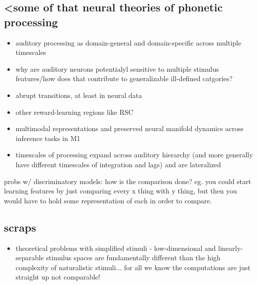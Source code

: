 \begin{multicols}{2}
\subsection{<some of that neural theories of phonetic processing}

\begin{itemize}
\item auditory processing as domain-general and domain-specific across multiple timescales \cite{norman-haignereHierarchicalIntegrationMultiple2020}
\item why are auditory neurons potentialyl sensitive to multiple stimulus features/how does that contribute to generalizable ill-defined catgories? \cite{macellaioWhySensoryNeurons2020}
\item abrupt transitions, at least in neural data \cite{durstewitzAbruptTransitionsPrefrontal2010}
\item other reward-learning regions like RSC \cite{millerRetrosplenialCorticalRepresentations2019}
\item multimodal representations and preserved neural manifold dynamics across inference tasks in M1 \cite{gallegoCorticalPopulationActivity2018}
\item timescales of processing expand across auditory hierarchy (and more generally have different timescales of integration and lags) \cite{norman-haignereHierarchicalIntegrationMultiple2020} and are lateralized \cite{levyCircuitAsymmetriesUnderlie2019a}
\end{itemize}

probs w/ discriminatory models: how is the comparison done? eg. you could start learning features by just comparing every x thing with y thing, but then you would have to hold some representation of each in order to compare. 

\subsection{scraps}

\begin{itemize}
\item theoretical problems with simplified stimuli - low-dimensional and linearly-separable stimulus spaces are fundamentally different than the high complexity of naturalistic stimuli... for all we know the computations are just straight up not comparable! \cite{schuesslerInterplayRandomnessStructure2020}

\end{itemize}

\end{multicols}

% 
